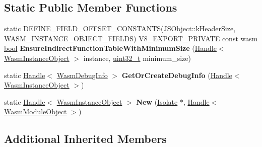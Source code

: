 \subsection*{Static Public Member Functions}
\begin{DoxyCompactItemize}
\item 
\mbox{\label{classv8_1_1internal_1_1WasmInstanceObject_a5e0e09ce76c2e55bcdf795abe9df895d}} 
static D\+E\+F\+I\+N\+E\+\_\+\+F\+I\+E\+L\+D\+\_\+\+O\+F\+F\+S\+E\+T\+\_\+\+C\+O\+N\+S\+T\+A\+N\+TS(J\+S\+Object\+::k\+Header\+Size, W\+A\+S\+M\+\_\+\+I\+N\+S\+T\+A\+N\+C\+E\+\_\+\+O\+B\+J\+E\+C\+T\+\_\+\+F\+I\+E\+L\+DS) V8\+\_\+\+E\+X\+P\+O\+R\+T\+\_\+\+P\+R\+I\+V\+A\+TE const wasm \mbox{\hyperlink{classbool}{bool}} {\bfseries Ensure\+Indirect\+Function\+Table\+With\+Minimum\+Size} (\mbox{\hyperlink{classv8_1_1internal_1_1Handle}{Handle}}$<$ \mbox{\hyperlink{classv8_1_1internal_1_1WasmInstanceObject}{Wasm\+Instance\+Object}} $>$ instance, \mbox{\hyperlink{classuint32__t}{uint32\+\_\+t}} minimum\+\_\+size)
\item 
\mbox{\label{classv8_1_1internal_1_1WasmInstanceObject_a63bb29a098158c1641b3ff5f142ac06f}} 
static \mbox{\hyperlink{classv8_1_1internal_1_1Handle}{Handle}}$<$ \mbox{\hyperlink{classv8_1_1internal_1_1WasmDebugInfo}{Wasm\+Debug\+Info}} $>$ {\bfseries Get\+Or\+Create\+Debug\+Info} (\mbox{\hyperlink{classv8_1_1internal_1_1Handle}{Handle}}$<$ \mbox{\hyperlink{classv8_1_1internal_1_1WasmInstanceObject}{Wasm\+Instance\+Object}} $>$)
\item 
\mbox{\label{classv8_1_1internal_1_1WasmInstanceObject_a905af2454d6a589a168f694f74b4840a}} 
static \mbox{\hyperlink{classv8_1_1internal_1_1Handle}{Handle}}$<$ \mbox{\hyperlink{classv8_1_1internal_1_1WasmInstanceObject}{Wasm\+Instance\+Object}} $>$ {\bfseries New} (\mbox{\hyperlink{classv8_1_1internal_1_1Isolate}{Isolate}} $\ast$, \mbox{\hyperlink{classv8_1_1internal_1_1Handle}{Handle}}$<$ \mbox{\hyperlink{classv8_1_1internal_1_1WasmModuleObject}{Wasm\+Module\+Object}} $>$)
\end{DoxyCompactItemize}
\subsection*{Additional Inherited Members}


